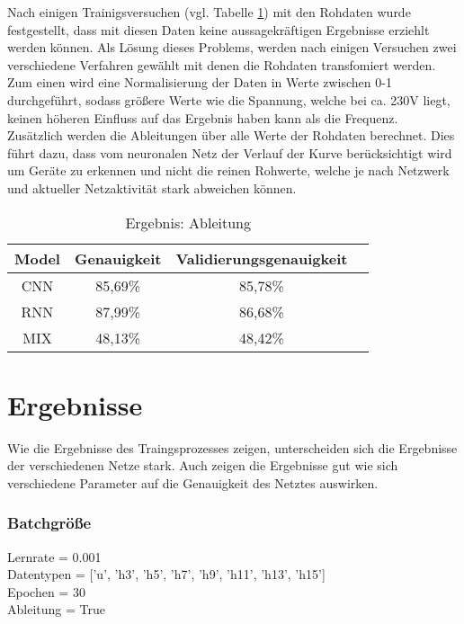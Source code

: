     \noindent
    Nach einigen Trainigsversuchen (vgl. Tabelle \ref{tabl:ErgebnisAbleitung}) mit den Rohdaten wurde festgestellt, dass mit diesen Daten keine aussagekräftigen Ergebnisse erziehlt werden können.
    Als Lösung dieses Problems, werden nach einigen Versuchen zwei verschiedene Verfahren gewählt mit denen die Rohdaten transfomiert werden. \\
    \noindent
    Zum einen wird eine Normalisierung der Daten in Werte zwischen 0-1 durchgeführt, sodass größere Werte wie die Spannung, welche bei ca. 230V liegt, keinen höheren Einfluss auf das Ergebnis haben kann als die Frequenz.\\
    \noindent
    Zusätzlich werden die Ableitungen über alle Werte der Rohdaten berechnet.
    Dies führt dazu, dass vom neuronalen Netz der Verlauf der Kurve berücksichtigt wird um Geräte zu erkennen und nicht die reinen Rohwerte, welche je nach Netzwerk und aktueller Netzaktivität stark abweichen können.

    \begin{table}[H]
        \centering
        \begin{tabular}{|c|c|c|c|}
            \hline
            Model & Genauigkeit & Validierungsgenauigkeit \\
            \hline
            CNN & 85,69\% & 85,78\% \\
            \hline
            RNN & 87,99\% & 86,68\% \\
            \hline
            MIX & 48,13\% & 48,42\% \\
            \hline
        \end{tabular}
        \caption{Ergebnis: Ableitung}
        \label{tabl:ErgebnisAbleitung}
    \end{table}

    \section{Ergebnisse} \label{Ergebnisse}

    Wie die Ergebnisse des Traingsprozesses zeigen, unterscheiden sich die Ergebnisse der verschiedenen Netze stark.
    Auch zeigen die Ergebnisse gut wie sich verschiedene Parameter auf die Genauigkeit des Netztes auswirken.

    \subsubsection{Batchgröße}

    Lernrate = 0.001\\
    \noindent
    Datentypen = ['u', 'h3', 'h5', 'h7', 'h9', 'h11', 'h13', 'h15']\\
    \noindent
    Epochen = 30\\
    \noindent
    Ableitung = True\\

